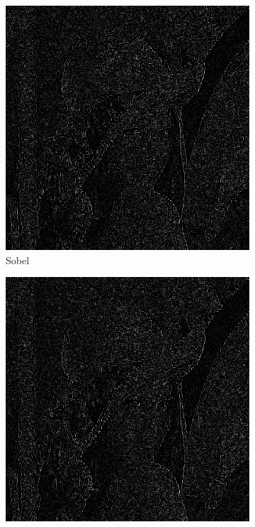 \documentclass[a4paper]{article}
\begin{document}
\begin{figure}[H]
\centering
	\begin{subfigure}[t]{0.3\textwidth}
	\centering
	\includegraphics[width=\textwidth]{imagenesInforme/lenaNonMaximumSupressionRayleighSobel}
	\caption{Sobel}
	\end{subfigure}
	\begin{subfigure}[t]{0.3\textwidth}
	\centering
	\includegraphics[width=\textwidth]{imagenesInforme/lenaNonMaximumSupressionRayleighPrewitt}

\end{subfigure}
\end{figure}
\end{document}
